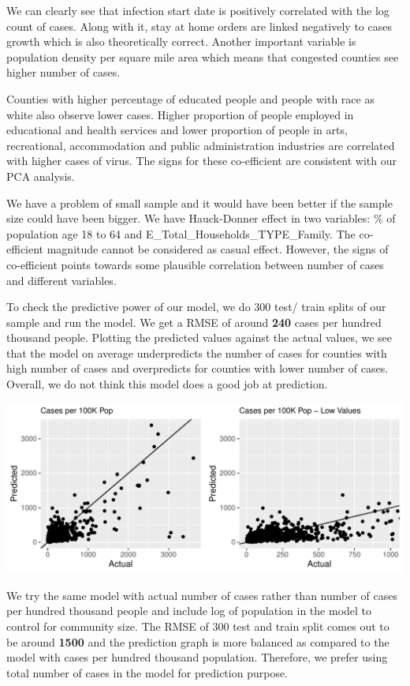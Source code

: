 \documentclass[
]{article}
\begin{document}
We can clearly see that infection start date is positively correlated
with the log count of cases. Along with it, stay at home orders are
linked negatively to cases growth which is also theoretically correct.
Another important variable is population density per square mile area
which means that congested counties see higher number of cases.

Counties with higher percentage of educated people and people with race
as white also observe lower cases. Higher proportion of people employed
in educational and health services and lower proportion of people in
arts, recreational, accommodation and public administration industries
are correlated with higher cases of virus. The signs for these
co-efficient are consistent with our PCA analysis.

We have a problem of small sample and it would have been better if the
sample size could have been bigger. We have Hauck-Donner effect in two
variables: \% of population age 18 to 64 and
E\_Total\_Households\_TYPE\_Family. The co-efficient magnitude cannot be
considered as casual effect. However, the signs of co-efficient points
towards some plausible correlation between number of cases and different
variables.

To check the predictive power of our model, we do 300 test/ train splits
of our sample and run the model. We get a RMSE of around \textbf{240}
cases per hundred thousand people. Plotting the predicted values against
the actual values, we see that the model on average underpredicts the
number of cases for counties with high number of cases and overpredicts
for counties with lower number of cases. Overall, we do not think this
model does a good job at prediction.

\includegraphics{covid_tree_analysis_files/figure-latex/unnamed-chunk-9-1.pdf}

We try the same model with actual number of cases rather than number of
cases per hundred thousand people and include log of population in the
model to control for community size. The RMSE of 300 test and train
split comes out to be around \textbf{1500} and the prediction graph is
more balanced as compared to the model with cases per hundred thousand
population. Therefore, we prefer using total number of cases in the
model for prediction purpose.
\end{document}
